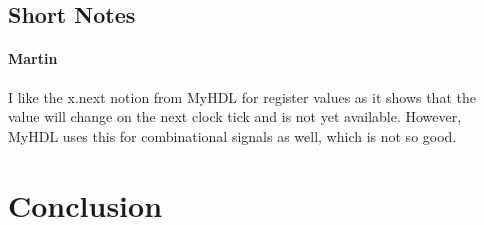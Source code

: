 \documentclass[10pt, conference, compsocconf]{IEEEtran}
\newcommand{\comment}[3]{\paragraph*{\textbf{#1}}{\color{#3}#2}}
\newcommand{\martin}[1]{\comment{Martin}{#1}{Blue}}
\begin{document}
\subsection{Short Notes}

\martin{I like the x.next notion from MyHDL for register values as it shows
that the value will change on the next clock tick and is not yet available.
However, MyHDL uses this for combinational signals as well, which is not
so good.}

\section{Conclusion}
\label{sec:conclusion}





\end{document}
